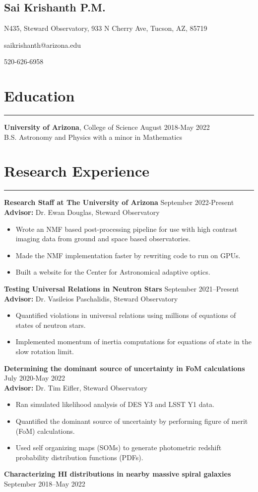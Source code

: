 \documentclass[11pt]{article}
\newcommand{\name}[1]{\begin{center}\section*{\huge #1}\end{center}}
\newcommand{\topinfo}[1]{\begin{center}\vspace{-0.2cm}#1\vspace{-0.2cm}\end{center}}
\newcommand{\resumesection}[1]{\vspace{-0.2cm}\section*{#1}\vspace{-0.2cm}\hrule\vspace{0.2cm}}
\begin{document}
\name{Sai Krishanth P.M.}
\topinfo{N435, Steward Observatory, 933 N Cherry Ave, Tucson, AZ, 85719}
\topinfo{saikrishanth@arizona.edu}
\topinfo{520-626-6958}

\resumesection{Education}
\textbf{University of Arizona}, College of Science \hfill August 2018-May 2022
\\ B.S. Astronomy and Physics with a minor in Mathematics 

\resumesection{Research Experience}
\textbf{Research Staff at The University of Arizona}  \hfill September 2022-Present
\\\textbf{Advisor:} Dr. Ewan Douglas, Steward Observatory
\begin{itemize}
	\item Wrote an NMF based post-processing pipeline for use with high contrast imaging data from ground and space based observatories.
    \item Made the NMF implementation faster by rewriting code to run on GPUs.
    \item Built a website for the Center for Astronomical adaptive optics.
\end{itemize}
\textbf{Testing Universal Relations in Neutron Stars}  \hfill September 2021--Present
\\\textbf{Advisor:} Dr. Vasileios Paschalidis, Steward Observatory
\begin{itemize}
	\item Quantified violations in universal relations using millions of equations of states of neutron stars. 
	\item Implemented momentum of inertia computations for equations of state in the slow rotation limit.
\end{itemize}
\textbf{Determining the dominant source of uncertainty in FoM calculations} \hfill July 2020-May 2022
\\ \textbf{Advisor:} Dr. Tim Eifler, Steward Observatory
\begin{itemize}
	\item Ran simulated likelihood analysis of DES Y3 and LSST Y1 data.
	\item Quantified the dominant source of uncertainty by performing figure of merit (FoM) calculations.
	\item Used self organizing maps (SOMs) to generate photometric redshift probability distribution functions (PDFs). 
\end{itemize}
\textbf{Characterizing HI distributions in nearby massive spiral galaxies}  \hfill September 2018--May 2022
\end{document}
